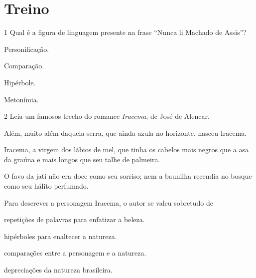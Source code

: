 \section*{Treino}

\num{1} Qual é a figura de linguagem presente na frase ``Nunca li Machado de Assis''?

\begin{escolha}

  \item Personificação.
  
  \item Comparação.
  
  \item Hipérbole.
  
  \item Metonímia. 

\end{escolha}

\num{2} Leia um famosos trecho do romance \textit{Iracema}, de José de Alencar.

\begin{myquote}

Além, muito além daquela serra, que ainda azula no
horizonte, nasceu Iracema.

Iracema, a virgem dos lábios de mel, que tinha os
cabelos mais negros que a asa da graúna e mais longos
que seu talhe de palmeira.

O favo da jati não era doce como seu sorriso; nem
a baunilha recendia no bosque como seu hálito perfumado.


\end{myquote}


Para descrever a personagem Iracema, o autor se valeu sobretudo de

\begin{escolha}

  \item repetições de palavras para enfatizar a beleza. 

  \item hipérboles para enaltecer a natureza.

  \item comparações entre a personagem e a natureza.

  \item depreciações da natureza brasileira.

\end{escolha}

